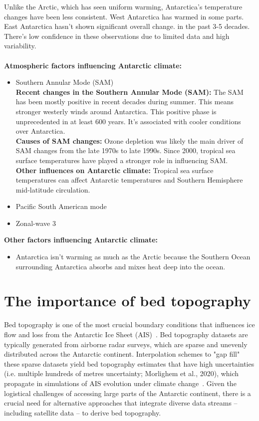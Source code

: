 Unlike the Arctic, which has seen uniform warming, Antarctica's temperature changes have been less consistent. West Antarctica has warmed in some parts. East Antarctica hasn't shown significant overall change. in the past 3-5 decades. There's low confidence in these observations due to limited data and high variability\cite{O_C_in_changingClimate}. \\\\
\textbf{Atmospheric factors influencing Antarctic climate:}
\begin{itemize}
\item Southern Annular Mode (SAM)\\
    \textbf{Recent changes in the Southern Annular Mode (SAM):} The SAM has been mostly positive in recent decades during summer. This means stronger westerly winds around Antarctica. This positive phase is unprecedented in at least 600 years. It's associated with cooler conditions over Antarctica\cite{O_C_in_changingClimate}.\\
    \textbf{Causes of SAM changes:} Ozone depletion was likely the main driver of SAM changes from the late 1970s to late 1990s. Since 2000, tropical sea surface temperatures have played a stronger role in influencing SAM\cite{O_C_in_changingClimate}.\\
    \textbf{Other influences on Antarctic climate:} Tropical sea surface temperatures can affect Antarctic temperatures and Southern Hemisphere mid-latitude circulation\cite{JACOBS_2004}.
\item Pacific South American mode
\item Zonal-wave 3
\end{itemize}

\textbf{Other factors influencing Antarctic climate:}
\begin{itemize}
\item Antarctica isn't warming as much as the Arctic because the Southern Ocean surrounding Antarctica absorbs and mixes heat deep into the ocean\cite{L_T_C_C}.
\end{itemize}

\section*{The importance of bed topography}
Bed topography is one of the most crucial boundary conditions that influences ice flow and loss from the Antarctic Ice Sheet (AIS)~\cite{DeepGlacialTroughs}. Bed topography datasets are typically generated from airborne radar surveys, which are sparse and unevenly distributed across the Antarctic continent. Interpolation schemes to "gap fill" these sparse datasets yield bed topography estimates that have high uncertainties (i.e. multiple hundreds of metres uncertainty; Morlighem et al., 2020), which propagate in simulations of AIS evolution under climate change~\cite{ReductionOfUncertaintyThwaites}. Given the logistical challenges of accessing large parts of the Antarctic continent, there is a crucial need for alternative approaches that integrate diverse data streams – including satellite data – to derive bed topography.

